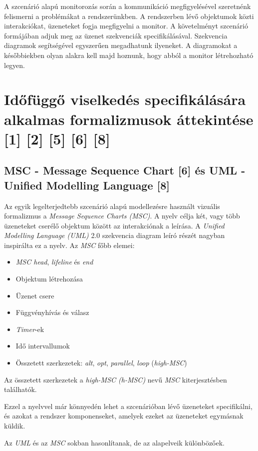 A szcenárió alapú monitorozás során a kommunikáció megfigyelésével szeretnénk felismerni a problémákat a rendszerünkben.
A rendszerben lévő objektumok közti interakciókat, üzeneteket fogja megfigyelni a monitor.
A követelményt szcenárió formájában adjuk meg az üzenet szekvenciák specifikálásával.
Szekvencia diagramok segítségével egyszerűen megadhatunk ilyeneket.
A diagramokat a későbbiekben olyan alakra kell majd hoznunk, hogy abból a monitor létrehozható legyen.

\section{Időfüggő viselkedés specifikálására alkalmas formalizmusok áttekintése [1] [2] [5] [6] [8]}
\subsection{MSC - Message Sequence Chart [6] és UML - Unified Modelling Language [8]}

Az egyik legelterjedtebb szcenárió alapú modellezésre használt vizuális formalizmus a \textit{Message Sequence Charts (MSC)}.
A nyelv célja két, vagy több üzeneteket cserélő objektum között az interakciónak a leírása.
A \textit{Unified Modelling Language (UML)} 2.0 szekvencia diagram leíró részét nagyban inspirálta ez a nyelv.
Az \textit{MSC} főbb elemei:

\begin{itemize}
\item \textit{MSC head}, \textit{lifeline} és \textit{end}
\item Objektum létrehozása
\item Üzenet csere
\item Függvényhívás és válasz
\item \textit{Timer}-ek
\item Idő intervallumok
\item Összetett szerkezetek: \textit{alt}, \textit{opt}, \textit{parallel}, \textit{loop} (\textit{high-MSC})
\end{itemize}

Az összetett szerkezetek a \textit{high-MSC (h-MSC)} nevű \textit{MSC} kiterjesztésben találhatók.

Ezzel a nyelvvel már könnyedén lehet a szcenárióban lévő üzeneteket specifikálni, és azokat a rendszer komponenseket, amelyek ezeket az üzeneteket egymásnak küldik.

Az \textit{UML} és az \textit{MSC} sokban hasonlítanak, de az alapelveik különbözőek.

